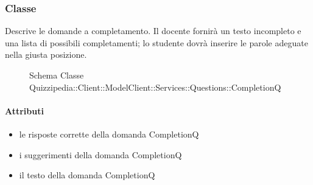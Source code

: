\subsubsection{Classe }
Descrive le domande a completamento. Il docente fornirà un testo incompleto e una lista di possibili completamenti; lo studente dovrà inserire le parole adeguate nella giusta posizione.
\begin{figure}[H]
\centering
\noindent{}
\caption[Schema Classe CompletionQ]{Schema Classe Quizzipedia::Client::ModelClient::Services::Questions::CompletionQ}
\end{figure}
\paragraph{Attributi}
\begin{itemize}
\item {}
\newline
le risposte corrette della domanda CompletionQ
\item {}
\newline
i suggerimenti della domanda CompletionQ
\item {}
\newline
il testo della domanda CompletionQ
\end{itemize}
